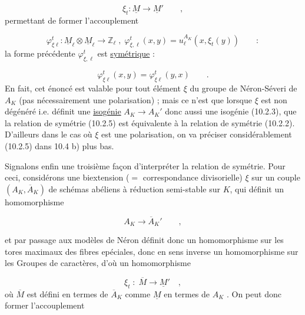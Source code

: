 \begin{equation}\tag{10.2.3}
\xi_t : \underline{M} \longrightarrow \underline{M}' \qquad ,
\end{equation}
permettant de former l'accouplement

\begin{equation}\tag{10.2.4}
\varphi^t_{\xi\ell} : \underline{M}_\ell \otimes \underline{M}_\ell \longrightarrow \mathbb{Z}_\ell \; , \; \varphi^t_{\xi,\ell}(x,y) = u_\ell^{A_K}(x,\xi_t(y)) \qquad :
\end{equation}
la forme précédente $\varphi^t_{\xi,\ell}$ est \underline{symétrique} :

\begin{equation}\tag{10.2.5}
\varphi^t_{\xi\ell}(x,y) = \varphi^t_{\xi\ell}(y,x) \qquad .
\end{equation}
En fait, cet énoncé est valable pour tout élément $\xi$ du groupe de Néron-Séveri de $A_K$ (pas nécessairement une polarisation) ; mais ce n'est que lorsque $\xi$ est non dégénéré i.e. définit une \underline{isogénie} $A_K \to A_K'$ donc aussi une isogénie (10.2.3), que la relation de symétrie (10.2.5) est équivalente à la relation de symétrie (10.2.2). D'ailleurs dans le cas où $\xi$ est une polarisation, on va préciser considérablement (10.2.5) dans 10.4 b) plus bas.

Signalons enfin une troisième façon d'interpréter la relation de symétrie. Pour ceci, considérons une biextension ($=$ correspondance divisorielle) $\xi$ sur un couple $(A_K,\overline{A}_K)$ de schémas abéliens à réduction semi-stable sur $K$, qui définit un homomorphisme

\begin{equation*}
A_K \longrightarrow \overline{A}_K' \qquad ,
\end{equation*}


et par passage aux modèles de Néron définit donc un homomorphisme sur les tores maximaux des fibres epéciales, donc en sens inverse un homomorphisme sur les Groupes de caractères, d'où un homomorphisme

\begin{equation}\tag{10.2.6}
\xi_t \; : \; \overline{M} \longrightarrow \underline{M}' \quad ,
\end{equation}
où $\overline{M}$ est défini en termes de $\overline{A}_K$ comme $\underline{M}$ en termes de $A_K$ . On peut donc former l'accouplement

